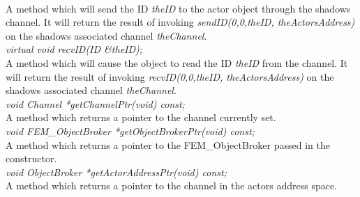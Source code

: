 \\
A method which will send the ID {\em theID} to
the actor object through the shadows channel. It will return the
result of invoking {\em sendID(0,0,theID, theActorsAddress)} on the
shadows associated channel {\em theChannel}. \\ 


{\em virtual void recvID(ID \&theID);} \\
A method which will cause the object to read the ID {\em
theID} from the channel. It will return the
result of invoking {\em recvID(0,0,theID, theActorsAddress)} on the
shadows associated channel {\em theChannel}. \\ 


{\em void Channel *getChannelPtr(void) const;}\\
A method which returns a pointer to the channel currently set. \\

{\em void FEM\_ObjectBroker *getObjectBrokerPtr(void) const;}\\
A method which returns a pointer to the FEM\_ObjectBroker passed in the
constructor. \\

{\em void ObjectBroker *getActorAddressPtr(void) const;}\\
A method which returns a pointer to the channel in the actors address
space. \\

